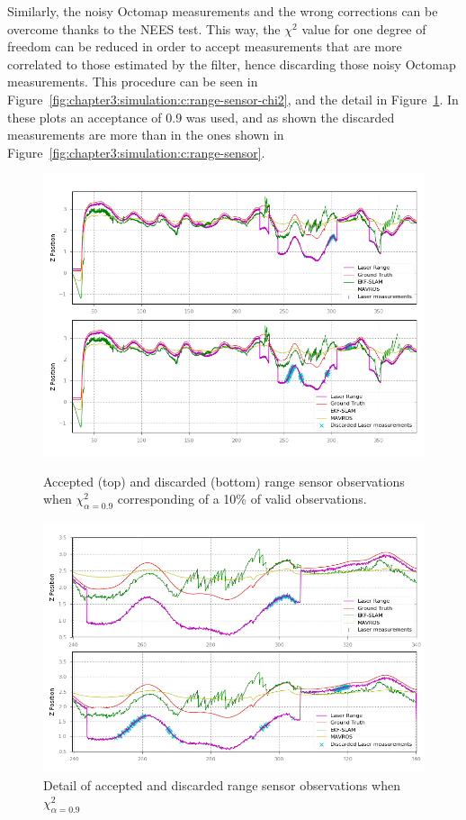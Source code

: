 Similarly, the noisy Octomap measurements and the wrong corrections can be overcome thanks to the \ac{NEES} test. This way, the $\chi^2$ value for one degree of freedom can be reduced in order to accept measurements that are more correlated to those estimated by the filter, hence discarding those noisy Octomap measurements. This procedure can be seen in Figure~\ref{fig:chapter3:simulation:c:range-sensor-chi2}, and the detail in Figure~\ref{fig:chapter3:simulation:c:range-sensor-detail-chi2}. In these plots an acceptance of 0.9 was used, and as shown the discarded measurements are more than in the ones shown in Figure~\ref{fig:chapter3:simulation:c:range-sensor}.\\
\begin{figure}
    \centering
    \includegraphics[width=\textwidth]{Images/fig23-laser-chi2.png}
    \caption[Accepted and discarded range sensor observations when $\chi_{\alpha=0.9}^2$]{Accepted (top) and discarded (bottom) range sensor observations when $\chi_{\alpha=0.9}^2$ corresponding of a 10\% of valid observations.}
    \label{fig:chapter3:simulation:c:range-sensor-chi2}
    \centering
    \includegraphics[width=\textwidth]{Images/fig23-laser-chi2-detail.png}
    \caption{Detail of accepted and discarded range sensor observations when $\chi_{\alpha=0.9}^2$}
    \label{fig:chapter3:simulation:c:range-sensor-detail-chi2}
\end{figure}





















